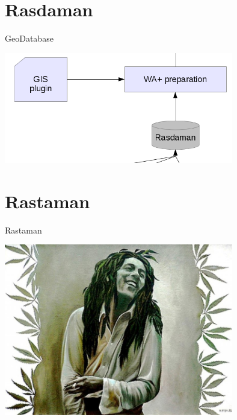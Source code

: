 \documentclass[xcolor=dvipsnames,beamer]{beamer} %
\begin{document}
\section{Rasdaman}
\begin{frame}[fragile]{GeoDatabase}

\begin{center}
 \includegraphics[width=10cm]{2}
\end{center}

\end{frame}

\section{Rastaman}
\begin{frame}[fragile]{Rastaman}

\begin{center}
 \includegraphics[width=10cm]{bob}
\end{center}

\end{frame}
\end{document}
